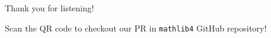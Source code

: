 \documentclass[aspectratio=169,11pt]{beamer}
\begin{document}
\begin{frame}[plain]
  \centering
  \vfill
  {\color{accent}Thank you for listening!}

  \vspace{2em}

  \vspace{1em}
  {\small Scan the QR code to checkout our PR in \texttt{mathlib4} GitHub repository!}
  \vfill
\end{frame}
\end{document}

